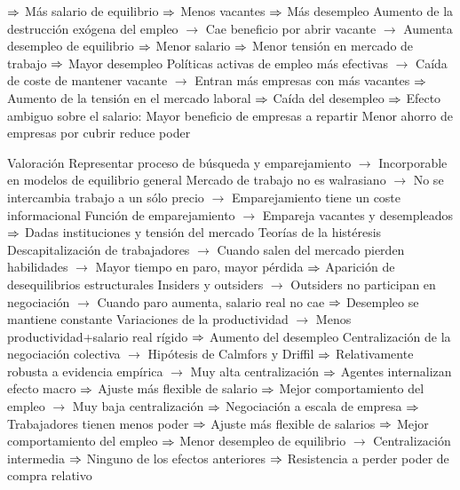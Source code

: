 \documentclass{nuevotema}
\begin{document}
\begin{esquemal}
				\4[] $\Rightarrow$ Más salario de equilibrio
				\4[] $\Rightarrow$ Menos vacantes
				\4[] $\Rightarrow$ Más desempleo
				\4 Aumento de la destrucción exógena del empleo
				\4[] $\to$ Cae beneficio por abrir vacante
				\4[] $\to$ Aumenta desempleo de equilibrio
				\4[] $\Rightarrow$ Menor salario
				\4[] $\Rightarrow$ Menor tensión en mercado de trabajo
				\4[] $\Rightarrow$ Mayor desempleo
				\4 Políticas activas de empleo más efectivas
				\4[] $\to$ Caída de coste de mantener vacante
				\4[] $\to$ Entran más empresas con más vacantes
				\4[] $\Rightarrow$ Aumento de la tensión en el mercado laboral
				\4[] $\Rightarrow$ Caída del desempleo
				\4[] $\Rightarrow$ Efecto ambiguo sobre el salario:
				\4[] \quad Mayor beneficio de empresas a repartir
				\4[] \quad Menor ahorro de empresas por cubrir reduce poder

			\3 Valoración
				\4[] Representar proceso de búsqueda y emparejamiento
				\4[] $\to$ Incorporable en modelos de equilibrio general
				\4[] Mercado de trabajo no es walrasiano
				\4[] $\to$ No se intercambia trabajo a un sólo precio
				\4[] $\to$ Emparejamiento tiene un coste informacional
				\4[] Función de emparejamiento
				\4[] $\to$ Empareja vacantes y desempleados
				\4[] $\Rightarrow$ Dadas instituciones y tensión del mercado
				\4 Teorías de la histéresis
				\4[] Descapitalización de trabajadores
				\4[] $\to$ Cuando salen del mercado pierden habilidades
				\4[] $\to$ Mayor tiempo en paro, mayor pérdida
				\4[] $\Rightarrow$ Aparición de desequilibrios estructurales
				\4[] Insiders y outsiders
				\4[] $\to$ Outsiders no participan en negociación
				\4[] $\to$ Cuando paro aumenta, salario real no cae
				\4[] $\Rightarrow$ Desempleo se mantiene constante
				\4[] Variaciones de la productividad
				\4[] $\to$ Menos productividad+salario real rígido
				\4[] $\Rightarrow$ Aumento del desempleo
				\4[] Centralización de la negociación colectiva
				\4[] $\to$ Hipótesis de Calmfors y Driffil
				\4[] $\Rightarrow$ Relativamente robusta a evidencia empírica
				\4[] $\to$ Muy alta centralización
				\4[] $\Rightarrow$ Agentes internalizan efecto macro
				\4[] $\Rightarrow$ Ajuste más flexible de salario
				\4[] $\Rightarrow$ Mejor comportamiento del empleo
				\4[] $\to$ Muy baja centralización
				\4[] $\Rightarrow$ Negociación a escala de empresa
				\4[] $\Rightarrow$ Trabajadores tienen menos poder
				\4[] $\Rightarrow$ Ajuste más flexible de salarios
				\4[] $\Rightarrow$ Mejor comportamiento del empleo
				\4[] $\Rightarrow$ Menor desempleo de equilibrio
				\4[] $\to$ Centralización intermedia
				\4[] $\Rightarrow$ Ninguno de los efectos anteriores
				\4[] $\Rightarrow$ Resistencia a perder poder de compra relativo

\end{esquemal}
\end{document}

